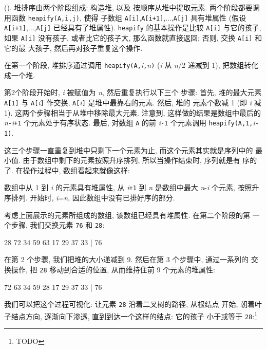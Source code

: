  (). 堆排序由两个阶段组成: 构造堆, 以及 
按顺序从堆中提取元素. 两个阶段都要调用函数 \texttt{heapify(A,i,j)}, 使得
子数组 \texttt{A[i]},\texttt{A[i+1]},...,\texttt{A[j]} 具有堆属性 (假设 
\texttt{A[i+1]},...,\texttt{A[j]} 已经具有了堆属性). \texttt{heapify}
的基本操作是比较 \texttt{A[i]} 与它的孩子, 如果 \texttt{A[i]} 没有孩子,
或者比它的孩子大, 那么函数就直接返回; 否则, 交换 \texttt{A[i]} 和它的最
大孩子, 然后再对孩子重复这个操作.

在第一个阶段, 堆排序通过调用
\texttt{heapify(A,}\textit{i}\texttt{,}\textit{n}\texttt{)} (\textit{i} 从
\textit{n}/2 递减到 1), 把数组转化成一个堆.

第2个阶段开始时, \textit{i} 被赋值为 \textit{n}, 然后重复执行以下三个
步骤: 首先, 堆的最大元素 \texttt{A[1]} 与 \texttt{A[}\textit{i}\texttt{]}
作交换, \texttt{A[}\textit{i}\texttt{]} 是堆中最靠右的元素. 然后, 堆的 
元素个数减 1 (即 \textit{i} 减 1). 这两个步骤相当于从堆中移除最大元素.
注意到, 这样做的结果是数组中最后的
\textit{n}\texttt{-}\textit{i}\texttt{+1} 个元素处于有序状态. 最后,
对数组 \texttt{A} 的前 \textit{i}\texttt{-1} 个元素调用
\texttt{heapify(A,1,}\textit{i}\texttt{-1)}.

这三个步骤一直重复到堆中只剩下一个元素为止, 而这个元素其实就是序列中的
最小值. 由于数组中剩下的元素按照升序排列, 所以当操作结束时, 序列就是有
序的了. 在操作过程中, 数组看起来就像这样:
\begin{center}
\end{center}
数组中从 1 到 \textit{i} 的元素具有堆属性, 从 \textit{i}\texttt{+1} 到 
\textit{n} 是数组中最大 \textit{n}-\textit{i} 个元素, 按照升序排列.
开始时, \textit{i}=\textit{n}, 因此数组中没有已排好序的部分.

考虑上面展示的元素所组成的数组, 该数组已经具有堆属性. 在第二个阶段的第
一个步骤, 我们交换元素 \texttt{76} 和 \texttt{28}:
\begin{file}
    28 72 34 59 63 17 29 37 33 | 76
\end{file}
在第 2 个步骤, 我们把堆的大小递减到 9. 然后在第 3 个步骤中, 通过一系列的
交换操作, 把 \texttt{28} 移动到合适的位置, 从而维持住前 9 个元素的堆属性:
\begin{file}
    72 63 34 59 28 17 29 37 33 | 76
\end{file}
我们可以把这个过程可视化: 让元素 \texttt{28} 沿着二叉树的路径, 从根结点
开始, 朝着叶子结点方向, 逐渐向下渗透, 直到到达一个这样的结点: 它的孩子 
小于或等于 \texttt{28}:\footnote{TODO}

